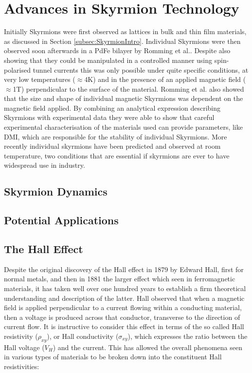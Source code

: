 \section{Advances in Skyrmion Technology}\label{sec:AdvancesSkyrmionTech}
Initially Skyrmions were first observed as lattices in bulk and thin film materials, as discussed in Section \ref{subsec:SkyrmionIntro}. Individual Skyrmions were then observed soon afterwards in a PdFe bilayer by Romming et al.\cite{Romming2013}. Despite also showing that they could be manipulated in a controlled manner using spin-polarised tunnel currents this was only possible under quite specific conditions, at very low temperatures ($\approx$4K) and in the presence of an applied magnetic field ($\approx$1T) perpendicular to the surface of the material\cite{Romming2013}. Romming et al. also showed that the size and shape of individual magnetic Skyrmions was dependent on the magnetic field applied. By combining an analytical expression describing Skyrmions with experimental data they were able to show that careful experimental characterisation of the materials used can provide parameters, like DMI, which are responsible for the stability of individual Skyrmions\cite{Romming2015}. More recently individual skyrmions have been predicted\cite{Moreau-Luchaire2016} and observed at room temperature\cite{Woo2016,Boulle2016}, two conditions that are essential if skyrmions are ever to have widespread use in industry.

    \subsection{Skyrmion Dynamics}\label{subsec:Dynamics}

    \subsection{Potential Applications}\label{subsec:Applications}

    \subsection{The Hall Effect}\label{subsec:HallEffect}
    Despite the original discovery of the Hall effect in 1879 by Edward Hall, first for normal metals\cite{Hall1879}, and then in 1881 the larger effect which seen in ferromagnetic materials\cite{Hall1881}, it has taken well over one hundred years to establish a firm theoretical understanding and description of the latter. Hall observed that when a magnetic field is applied perpendicular to a current flowing within a conducting material, then a voltage is produced across that conductor, transverse to the direction of current flow\cite{Hall1879}. It is instructive to consider this effect in terms of the so called Hall resistivity ($\rho_{xy}$), or Hall conductivity ($\sigma_{xy}$), which expresses the ratio between the Hall voltage ($V_{H}$) and the current. This has allowed the overall phenomena seen in various types of materials to be broken down into the constituent Hall resistivities:

